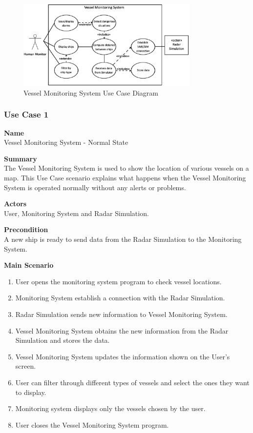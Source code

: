 \begin{figure}[h]
\caption{Vessel Monitoring System Use Case Diagram}
\includegraphics[width=0.8\textwidth]{vmsdiagram.eps}
\end{figure}

\subsubsection{Use Case 1} \label{uc:1}

\noindent
{\bf Name}\\
Vessel Monitoring System - Normal State

\noindent
{\bf Summary}\\
The Vessel Monitoring System is used to show the location of various vessels on a map. This Use Case scenario explains what happens when the Vessel Monitoring System is operated normally without any alerts or problems.

\noindent
{\bf Actors}\\
User, Monitoring System and Radar Simulation.

\noindent
{\bf Precondition}\\
A new ship is ready to send data from the Radar Simulation to the Monitoring System.

\noindent
{\bf Main Scenario}\\
\vspace*{-0.2in}
\begin{enumerate}
\item User opens the monitoring system program to check vessel locations.
\item Monitoring System establish a connection with the Radar Simulation.
\item Radar Simulation sends new information to Vessel Monitoring System.
\item Vessel Monitoring System obtains the new information from the Radar Simulation and stores the data.
\item Vessel Monitoring System updates the information shown on the User's screen.
\item User can filter through different types of vessels and select the ones they want to display.
\item Monitoring system displays only the vessels chosen by the user.
\item User closes the Vessel Monitoring System program.
\end{enumerate}

